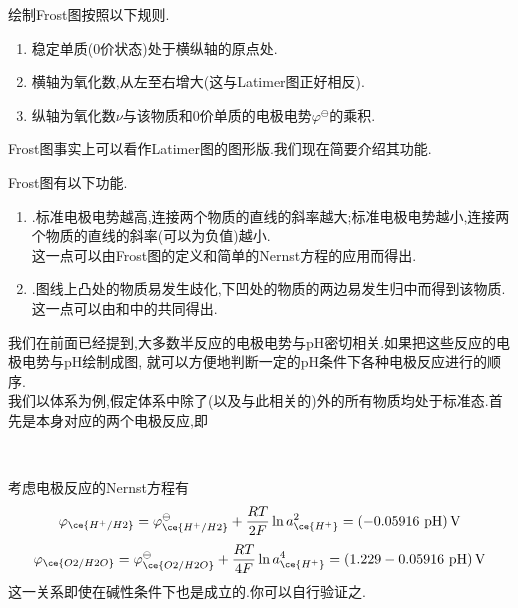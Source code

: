 \documentclass{ctexart}
\begin{document}
\begin{theorem}[6D.3.5 Frost图的画法]
    绘制Frost图按照以下规则.
    \begin{enumerate}[topsep=0pt,parsep=0pt,itemsep=0pt,partopsep=0pt,leftmargin=*,label=\tbf{\arabic*.}]
        \item 稳定单质(0价状态)处于横纵轴的原点处.
        \item 横轴为氧化数,从左至右增大(这与Latimer图正好相反).
        \item 纵轴为氧化数$\nu$与该物质和0价单质的电极电势$\varphi^\ominus$的乘积.
    \end{enumerate}
\end{theorem}
Frost图事实上可以看作Latimer图的图形版.我们现在简要介绍其功能.
\begin{theorem}[6D.3.6 Frost图的功能]
    Frost图有以下功能.
    \begin{enumerate}[topsep=0pt,parsep=0pt,itemsep=0pt,partopsep=0pt,leftmargin=*,label=\tbf{\arabic*.}]
        \item {}.标准电极电势越高,连接两个物质的直线的斜率越大;标准电极电势越小,连接两个物质的直线的斜率(可以为负值)越小.\\
            这一点可以由Frost图的定义和简单的Nernst方程的应用而得出.
        \item {}.图线上凸处的物质易发生歧化,下凹处的物质的两边易发生归中而得到该物质.\\
            这一点可以由和中的共同得出.
    \end{enumerate}
\end{theorem}
\indent 我们在前面已经提到,大多数半反应的电极电势与pH密切相关.如果把这些反应的电极电势与pH绘制成图,%
就可以方便地判断一定的pH条件下各种电极反应进行的顺序.\\
\indent 我们以体系为例,假定体系中除了(以及与此相关的)外的所有物质均处于标准态.首先是本身对应的两个电极反应,即
\begin{tightcenter}
    \\
\end{tightcenter}
考虑电极反应的Nernst方程有
\[\varphi_{\ce{H^+/H2}}=\varphi_{\ce{H^+/H2}}^\ominus+\dfrac{RT}{2F}\ln a_{\ce{H^+}}^2=\left(-0.05916\text{ pH}\right)\text{V}\]
\[\varphi_{\ce{O2/H2O}}=\varphi_{\ce{O2/H2O}}^\ominus+\dfrac{RT}{4F}\ln a_{\ce{H^+}}^4=\left(1.229-0.05916\text{ pH}\right)\text{V}\]
这一关系即使在碱性条件下也是成立的.你可以自行验证之.\\
\end{document}
